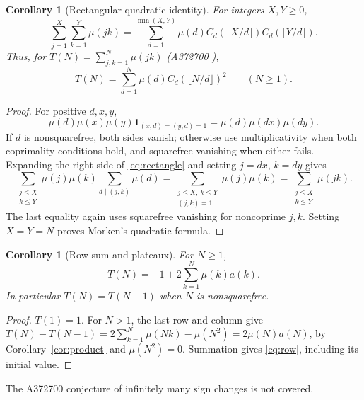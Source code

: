 \documentclass[11pt]{article}
\newtheorem{corollary}[theorem]{Corollary}
\newcommand{\mob}{\mu}
\newcommand{\C}{C}
\begin{document}
\begin{corollary}[Rectangular quadratic identity]\label{cor:quadratic}
For integers $X,Y\geq0$,
\begin{equation}\label{eq:rectangle}
 \sum_{j=1}^{X}\sum_{k=1}^{Y}\mob(jk)
 =\sum_{d=1}^{\min(X,Y)}\mob(d)
   \C_d(\lfloor X/d\rfloor)\C_d(\lfloor Y/d\rfloor).
\end{equation}
Thus, for $T(N)=\sum_{j,k=1}^{N}\mob(jk)$ (A372700 \cite{a372700}),
\begin{equation}\label{eq:quadratic}
 T(N)=\sum_{d=1}^{N}\mob(d)\C_d(\lfloor N/d\rfloor)^2
 \qquad(N\geq1).
\end{equation}
\end{corollary}
\begin{proof}
For positive $d,x,y$,
\[
 \mob(d)\mob(x)\mob(y)\mathbf1_{(x,d)=(y,d)=1}
       =\mob(d)\mob(dx)\mob(dy).
\]
If $d$ is nonsquarefree, both sides vanish; otherwise use
multiplicativity when both coprimality conditions hold, and squarefree
vanishing when either fails. Expanding the right side of
\eqref{eq:rectangle} and setting $j=dx$, $k=dy$ gives
\[
 \sum_{\substack{j\leq X\\k\leq Y}}\mob(j)\mob(k)
       \sum_{d\mid(j,k)}\mob(d)
   =\sum_{\substack{j\leq X,\ k\leq Y\\(j,k)=1}}\mob(j)\mob(k)
   =\sum_{\substack{j\leq X\\k\leq Y}}\mob(jk).
\]
The last equality again uses squarefree vanishing for noncoprime $j,k$.
Setting $X=Y=N$ proves Morken's quadratic formula.
\end{proof}

\begin{corollary}[Row sum and plateaux]\label{cor:row}
For $N\geq1$,
\begin{equation}\label{eq:row}
 T(N)=-1+2\sum_{k=1}^{N}\mob(k)a(k).
\end{equation}
In particular $T(N)=T(N-1)$ when $N$ is nonsquarefree.
\end{corollary}
\begin{proof}
$T(1)=1$. For $N>1$, the last row and column give
$T(N)-T(N-1)=2\sum_{k=1}^{N}\mob(Nk)-\mob(N^2)
=2\mob(N)a(N)$, by Corollary~\ref{cor:product} and $\mob(N^2)=0$.
Summation gives \eqref{eq:row}, including its initial value.
\end{proof}
The A372700 conjecture of infinitely many sign changes is not covered.
\end{document}
